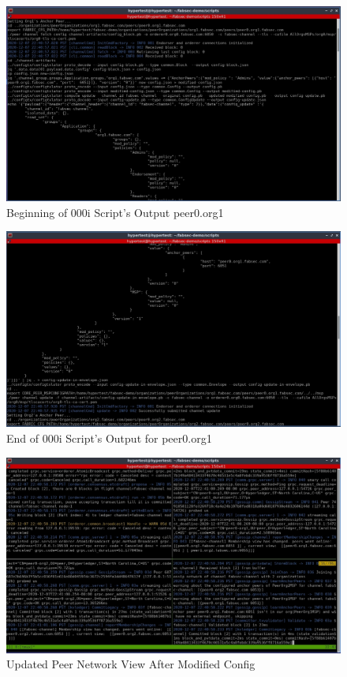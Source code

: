 		\begin{figure}[H]
		\includegraphics[width=\textwidth]{./fabsec-report-network-flow/network-flow-9.jpg}
		\caption{Beginning of 000i Script's Output peer0.org1}
		\end{figure}
		
		\begin{figure}[H]
		\includegraphics[width=.9\textwidth]{./fabsec-report-network-flow/network-flow-10.jpg}
		\centering
		\caption{End of 000i Script's Output for peer0.org1}
		\end{figure}
		
		\begin{figure}[H]
		\includegraphics[width=.9\textwidth]{./fabsec-report-network-flow/network-flow-11.jpg}
		\centering
		\caption{Updated Peer Network View After Modified Config}
		\end{figure}		
		
